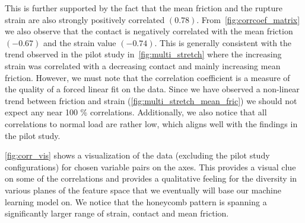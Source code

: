 This is further supported by the fact that the mean friction and the rupture
strain are also strongly positively correlated $(0.78)$. From~\cref{fig:corrcoef_matrix} we also observe that the contact is negatively
correlated with the mean friction $(-0.67)$ and the strain value $(-0.74)$. This is generally consistent with the trend observed in the pilot study in~\cref{fig:multi_stretch} where the increasing strain was correlated with a decreasing contact and mainly increasing mean friction. However, we must note that the correlation coefficient is a measure of the quality of a forced linear fit on the data. Since we have observed a non-linear trend between friction and strain (\cref{fig:multi_stretch_mean_fric}) we should not expect any near 100 \% correlations. Additionally, we also notice that all correlations to normal load are rather low, which aligns well with the findings in the pilot study. 

\cref{fig:corr_vis} shows a visualization of the data (excluding
the pilot study configurations) for chosen variable pairs on the axes. This
provides a visual clue on some of the correlations and provides a qualitative
feeling for the diversity in various planes of the feature space that we
eventually will base our machine learning model on. We notice that the
honeycomb pattern is spanning a significantly larger range of strain, contact
and mean friction.



